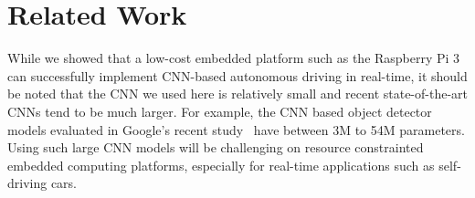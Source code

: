 \section{Related Work}


While we showed that a low-cost embedded platform such as the 
Raspberry Pi 3 can successfully implement CNN-based autonomous driving
in real-time, it should be noted that the CNN we used here is relatively
small and recent state-of-the-art CNNs tend to be much larger.
For example, the CNN based object detector models evaluated in
Google's recent study~\cite{huang2017speed} have between 3M to 54M
parameters. Using such large CNN models will be challenging on
resource constrainted embedded computing platforms, especially for
real-time applications such as self-driving cars.



